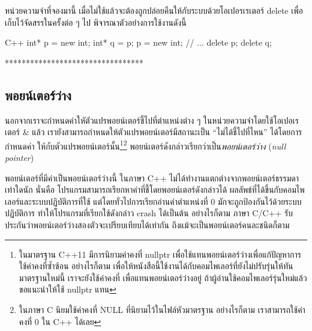 หน่วยความจำ{\wbr}ที่{\wbr}จอง{\wbr}มา{\wbr}นี้ เมื่อ{\wbr}ไม่{\wbr}ใช้{\wbr}แล้ว{\wbr}จะ{\wbr}ต้อง{\wbr}ถูก{\wbr}ปล่อย{\wbr}คืน{\wbr}ให้{\wbr}กับ{\wbr}ระบบ{\wbr}ด้วย{\wbr}โอ{\wbr}เป{\wbr}อร{\wbr}เรเตอร์ {\ct
  delete} เพื่อ{\wbr}เก็บ{\wbr}ไว้{\wbr}จัดสรร{\wbr}ใน{\wbr}ครั้ง{\wbr}ต่อ ๆ ไป  พิจารณา{\wbr}ตัวอย่าง{\wbr}การ{\wbr}ใช้{\wbr}งาน{\wbr}ดังนี้{\wbr}

\latintext
\begin{codelist}{C++}{}
int* p = new int;
int* q = p;
p = new int;
// ...
delete p;
delete q;
\end{codelist}
\thaitext

*********************************

\subsection{พอยน์เตอร์{\wbr}ว่าง}
นอกจาก{\wbr}เรา{\wbr}จะ{\wbr}กำหนด{\wbr}ค่า{\wbr}ใหัตัว{\wbr}แปร{\wbr}พอยน์เตอร์{\wbr}ชี้{\wbr}ไป{\wbr}ที่{\wbr}ตำแหน่ง{\wbr}ต่าง ๆ
ใน{\wbr}หน่วยความจำ{\wbr}โดย{\wbr}ใช้{\wbr}โอ{\wbr}เปอเรเตอร์ {\ct\&} แล้ว{\wbr}
เรา{\wbr}ยัง{\wbr}สามารถ{\wbr}กำหนด{\wbr}ให้{\wbr}ตัวแปร{\wbr}พอยน์เตอร์{\wbr}มี{\wbr}สถานะ{\wbr}เป็น ``ไม่{\wbr}ได้{\wbr}ชี้{\wbr}ไป{\wbr}ที่ไหน''
ได้{\wbr}โดย{\wbr}การ{\wbr}กำหนด{\wbr}ค่า {} ให้{\wbr}กับ{\wbr}ตัวแปร{\wbr}พอยน์เตอร์{\wbr}นั้น\footnote{ใน{\wbr}มาตรฐาน C++11
  มี{\wbr}การ{\wbr}นิยาม{\wbr}ค่าคงที่ {\ct nullptr}
  เพื่อ{\wbr}ใช้{\wbr}แทน{\wbr}พอยน์เตอร์{\wbr}ว่าง{\wbr}เพื่อ{\wbr}แก้{\wbr}ปัญหา{\wbr}การ{\wbr}ใช้{\wbr}ค่าคงที่{\wbr}ซ้ำซ้อน อย่างไรก็ตาม{\wbr}
  เพื่อให้{\wbr}หนังสือ{\wbr}นี้{\wbr}ใช้{\wbr}งาน{\wbr}ได้{\wbr}กับ{\wbr}คอม{\wbr}ไพ{\wbr}เลอร์{\wbr}ที่{\wbr}ยัง{\wbr}ไม่{\wbr}ปรับ{\wbr}รุ่น{\wbr}ให้{\wbr}ทัน{\wbr}มาตรฐาน{\wbr}ใหม่{\wbr}นี้{\wbr}
  เรา{\wbr}จะ{\wbr}ยัง{\wbr}ใช้{\wbr}ค่าคงที่ {} เพื่อ{\wbr}แทน{\wbr}พอยน์เตอร์{\wbr}ว่าง{\wbr}อยู่ ถ้า{\wbr}ผู้อ่าน{\wbr}ใช้{\wbr}คอม{\wbr}ไพ{\wbr}เลอร์{\wbr}รุ่น{\wbr}ใหม่{\wbr}แล้ว{\wbr}
  ขอ{\wbr}แนะนำ{\wbr}ให้{\wbr}ใช้ {\ct nullptr} แทน {}}\footnote{ใน{\wbr}ภาษา C นิยม{\wbr}ใช้{\wbr}ค่าคงที่{\wbr}
  {\ct NULL} ที่{\wbr}นิยาม{\wbr}ไว้{\wbr}ใน{\wbr}ไฟล์{\wbr}หัว{\wbr}มาตรฐาน อย่างไรก็ตาม เรา{\wbr}สามารถ{\wbr}ใช้{\wbr}ค่าคงที่ 0 ใน{\wbr}
  C++ ได้{\wbr}เลย} พอยน์เตอร์ดังกล่าว{\wbr}เรียก{\wbr}ว่า{\wbr}เป็น{\em พอยน์เตอร์ว่าง} ({\em null
  pointer})

พอยน์เตอร์ที่{\wbr}มี{\wbr}ค่า{\wbr}เป็น{\wbr}พอยน์เตอร์{\wbr}ว่าง{\wbr}นี้ ใน{\wbr}ภาษา C++
ไม่{\wbr}ได้{\wbr}ทำงาน{\wbr}แตกต่าง{\wbr}จาก{\wbr}พอยน์เตอร์{\wbr}ธรรมดา{\wbr}เท่าใด{\wbr}นัก นั่น{\wbr}คือ{\wbr}
โปรแกรม{\wbr}สามารถ{\wbr}เรียกหา{\wbr}ค่า{\wbr}ที่{\wbr}ชี้{\wbr}โดย{\wbr}พอยน์เตอร์{\wbr}ดังกล่าว{\wbr}ได้{\wbr}
ผลลัพธ์{\wbr}ที่{\wbr}ได้{\wbr}ขึ้น{\wbr}กับ{\wbr}คอม{\wbr}ไพ{\wbr}เลอร์{\wbr}และ{\wbr}ระบบปฏิบัติการ{\wbr}ที่{\wbr}ใช้ แต่{\wbr}โดย{\wbr}ทั่วไป{\wbr}การ{\wbr}เรียก{\wbr}อ่าน{\wbr}ค่า{\wbr}ตำแหน่ง{\wbr}ที่ 0
มักจะ{\wbr}ถูก{\wbr}ป้องกัน{\wbr}ไว้{\wbr}ด้วย{\wbr}ระบบปฏิบัติการ ทำ{\wbr}ให้{\wbr}โปรแกรม{\wbr}ที่{\wbr}เรียก{\wbr}ใช้{\wbr}ดังกล่าว crash ได้{\wbr}เป็นต้น{\wbr}
อย่างไรก็ตาม ภาษา C/C++ รับประกัน{\wbr}ว่า{\wbr}พอยน์เตอร์{\wbr}ว่าง{\wbr}สอง{\wbr}ตัว{\wbr}จะ{\wbr}เปรียบเทียบ{\wbr}ได้{\wbr}เท่า{\wbr}กัน{\wbr}
ถึงแม้{\wbr}จะ{\wbr}เป็น{\wbr}พอยน์เตอร์{\wbr}คน{\wbr}ละ{\wbr}ชนิด{\wbr}ก็ตาม{\wbr}

